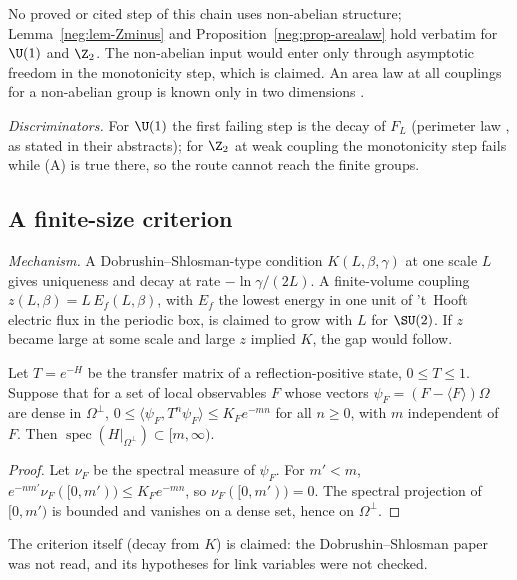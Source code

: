 No proved or cited step of this chain uses non-abelian structure; Lemma~\ref{neg:lem-Zminus}
and Proposition~\ref{neg:prop-arealaw} hold verbatim for $\U(1)$ and $\Z_2$. The non-abelian
input would enter only through asymptotic freedom in the monotonicity step, which is claimed.
An area law at all couplings for a non-abelian group is known only in two dimensions
\cite[p.~8]{Ch18}.

\emph{Discriminators.} For $\U(1)$ the first failing step is the decay of $F_L$ (perimeter law
\cite{Guth80,FS82}, as stated in their abstracts); for $\Z_2$ at weak coupling the monotonicity
step fails while (A) is true there, so the route cannot reach the finite groups.

\subsection{A finite-size criterion}\label{neg:sub-fs}

\emph{Mechanism.} A Dobrushin--Shlosman-type condition $K(L,\beta,\gamma)$ at one scale $L$
gives uniqueness and decay at rate $-\ln\gamma/(2L)$. A finite-volume coupling
$z(L,\beta)=L\,E_f(L,\beta)$, with $E_f$ the lowest energy in one unit of 't~Hooft electric flux
in the periodic box, is claimed to grow with $L$ for $\SU(2)$. If $z$ became large at some scale
and large $z$ implied $K$, the gap would follow.

\begin{lemma}\label{neg:lem-decaygap}
Let $T=e^{-H}$ be the transfer matrix of a reflection-positive state, $0\le T\le1$. Suppose
that for a set of local observables $F$ whose vectors $\psi_F=(F-\langle F\rangle)\Omega$ are
dense in $\Omega^\perp$, $0\le\langle\psi_F,T^n\psi_F\rangle\le K_Fe^{-mn}$ for all $n\ge0$, with
$m$ independent of $F$. Then $\operatorname{spec}(H|_{\Omega^\perp})\subset[m,\infty)$.
\end{lemma}

\begin{proof}
Let $\nu_F$ be the spectral measure of $\psi_F$. For $m'<m$,
$e^{-nm'}\nu_F([0,m'))\le K_Fe^{-mn}$, so $\nu_F([0,m'))=0$. The spectral projection of
$[0,m')$ is bounded and vanishes on a dense set, hence on $\Omega^\perp$.
\end{proof}

The criterion itself (decay from $K$) is claimed: the Dobrushin--Shlosman paper was not read,
and its hypotheses for link variables were not checked.

